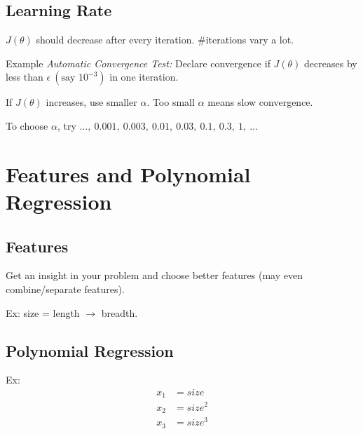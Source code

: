 \documentclass[a4paper, 12pt]{report}
\def\into{\rightarrow}
\begin{document}
\subsection{Learning Rate}
$J(\theta)$ should decrease after every iteration. $\#$iterations vary a lot.

Example \emph{Automatic Convergence Test:} Declare convergence if $J(\theta)$
decreases by less than $\epsilon\ (\text{say } 10^{-3})$ in one iteration.

If $J(\theta)$ increases, use smaller $\alpha$. Too small $\alpha$ means slow convergence.

To choose $\alpha$, try $\dots,\ 0.001,\ 0.003,\ 0.01,\ 0.03,\ 0.1,\ 0.3,\ 1,\ \dots$

\section{Features and Polynomial Regression}
\subsection{Features}
Get an insight in your problem and choose better features (may even combine/separate features).

Ex: size = length $\into$ breadth.

\subsection{Polynomial Regression}
Ex: \begin{align*}
	x_1 & = size   \\
	x_2 & = size^2 \\
	x_3 & = size^3 \\
\end{align*}
\end{document}
